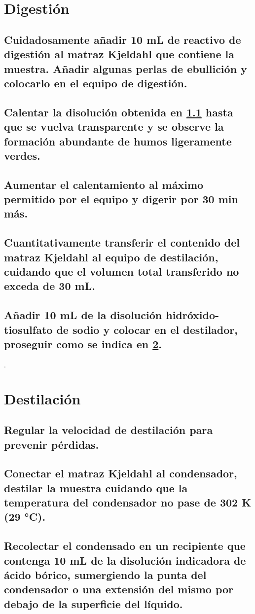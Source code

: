 \documentclass[spanish,12pt,letterpaper,titlepage]{article}
\theoremstyle{definition}
\begin{document}
	\section{Digestión}\label{A.4.3}
	\subsection{Cuidadosamente añadir 10 mL de reactivo de digestión al matraz Kjeldahl que contiene la muestra. Añadir algunas perlas de ebullición y colocarlo en el equipo de digestión.}\label{A.4.3.1}
	\subsection{Calentar la disolución obtenida en \ref{A.4.3.1} hasta que se vuelva transparente y se observe la formación abundante de humos ligeramente verdes.}\label{A.4.3.2}
	\subsection{Aumentar el calentamiento al máximo permitido por el equipo y digerir por 30 min más.}\label{A.4.3.3}
	\subsection{Cuantitativamente transferir el contenido del matraz Kjeldahl al equipo de destilación, cuidando que el volumen total transferido no exceda de 30 mL.}\label{A.4.3.4}
	\subsection{Añadir 10 mL de la disolución hidróxido-tiosulfato de sodio y colocar en el destilador, proseguir como se indica en \ref{A.4.4}.}\label{A.4.3.5}.
	\section{Destilación}\label{A.4.4}
	\subsection{Regular la velocidad de destilación para prevenir pérdidas.}\label{A.4.4.1}
	\subsection{Conectar el matraz Kjeldahl al condensador, destilar la muestra cuidando que la temperatura del condensador no pase de 302 K (29 °C).}\label{A.4.4.2}
	\subsection{Recolectar el condensado en un recipiente que contenga 10 mL de la disolución indicadora de ácido bórico, sumergiendo la punta del condensador o una extensión del mismo por debajo de la superficie del líquido.}\label{A.4.4.3}
\end{document}
